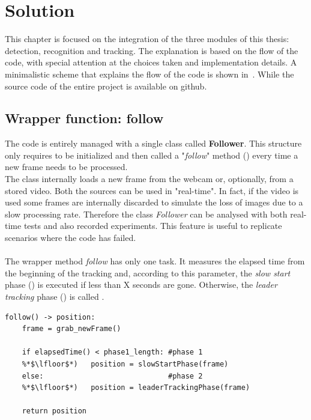 \chapter{Solution} \label{cha:solution}
This chapter is focused on the integration of the three modules of this thesis: detection, recognition and tracking. The explanation is based on the flow of the code, with special attention at the choices taken and implementation details. A minimalistic scheme that explains the flow of the code is shown in~. While the source code of the entire project is available on github\cite{projectSourceCode}.

\section{Wrapper function: follow} \label{sec:follow}
The code is entirely managed with a single class called \textbf{Follower}. This structure only requires to be initialized and then called a "\textit{follow}" method () every time a new frame needs to be processed.\\
The class internally loads a new frame  from the webcam or, optionally, from a stored video. Both the sources can be used in "real-time". In fact, if the video is used some frames are internally discarded to simulate the loss of images due to a slow processing rate. Therefore the class \textit{Follower} can be analysed with both real-time tests and also recorded experiments. This feature is useful to replicate scenarios where the code has failed.\\
\\
The wrapper method \textit{follow} has only one task. It measures the elapsed time from the beginning of the tracking  and, according to this parameter, the \textit{slow start} phase () is executed   if less than X seconds are gone. Otherwise, the \textit{leader tracking} phase () is called .

\begin{lstlisting}[captionpos=b, 
	caption={It is the pseudocode of the wrapper function that should grab the new incoming frames and redirect them to the first or second phase according to the time elapsed from the tracking begin.}, 
	label=alg:follow
	]
follow() -> position:
	frame = grab_newFrame()
	
	if elapsedTime() < phase1_length: #phase 1
	%*$\lfloor$*)	position = slowStartPhase(frame)
	else:							  #phase 2
	%*$\lfloor$*)	position = leaderTrackingPhase(frame)

	return position
\end{lstlisting}


